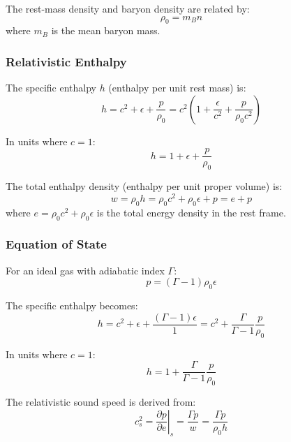 \documentclass[12pt,a4paper]{article}
\begin{document}
The rest-mass density and baryon density are related by:
\begin{equation}
\rho_0 = m_B n
\label{eq:rest_mass_baryon}
\end{equation}
where $m_B$ is the mean baryon mass.

\subsubsection{Relativistic Enthalpy}

The specific enthalpy $h$ (enthalpy per unit rest mass) is:
\begin{equation}
h = c^2 + \epsilon + \frac{p}{\rho_0} = c^2\left(1 + \frac{\epsilon}{c^2} + \frac{p}{\rho_0 c^2}\right)
\label{eq:specific_enthalpy}
\end{equation}

In units where $c = 1$:
\begin{equation}
h = 1 + \epsilon + \frac{p}{\rho_0}
\label{eq:specific_enthalpy_c1}
\end{equation}

The total enthalpy density (enthalpy per unit proper volume) is:
\begin{equation}
w = \rho_0 h = \rho_0 c^2 + \rho_0 \epsilon + p = e + p
\label{eq:enthalpy_density}
\end{equation}
where $e = \rho_0 c^2 + \rho_0 \epsilon$ is the total energy density in the rest frame.

\subsubsection{Equation of State}

For an ideal gas with adiabatic index $\Gamma$:
\begin{equation}
p = (\Gamma - 1)\rho_0 \epsilon
\label{eq:ideal_gas_eos}
\end{equation}

The specific enthalpy becomes:
\begin{equation}
h = c^2 + \epsilon + \frac{(\Gamma-1)\epsilon}{1} = c^2 + \frac{\Gamma}{\Gamma-1}\frac{p}{\rho_0}
\label{eq:enthalpy_ideal_gas}
\end{equation}

In units where $c = 1$:
\begin{equation}
h = 1 + \frac{\Gamma}{\Gamma-1}\frac{p}{\rho_0}
\label{eq:enthalpy_ideal_gas_c1}
\end{equation}

The relativistic sound speed is derived from:
\begin{equation}
c_s^2 = \left.\frac{\partial p}{\partial e}\right|_s = \frac{\Gamma p}{w} = \frac{\Gamma p}{\rho_0 h}
\label{eq:sound_speed_derivation}
\end{equation}
\end{document}
